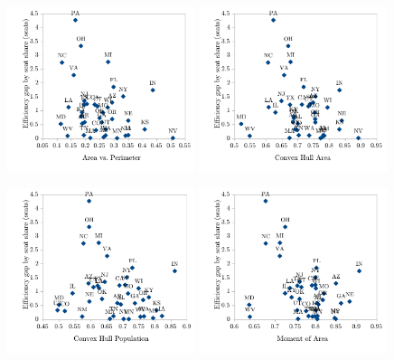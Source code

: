 \documentclass[12pt]{article}
\begin{document}
  \begin{figure}
    \begin{center}
      \includegraphics[width=0.49\textwidth]{sss-area_per.pdf}
      \includegraphics[width=0.49\textwidth]{sss-convex_hull.pdf}

      \includegraphics[width=0.49\textwidth]{sss-convex_hull_pop.pdf}
      \includegraphics[width=0.49\textwidth]{sss-moment_area.pdf}


\end{center}
\end{figure}
\end{document}
